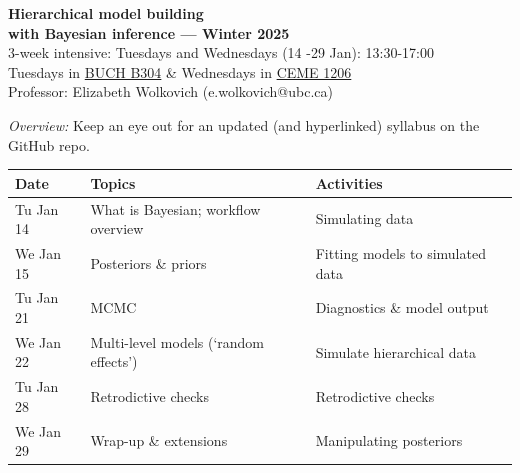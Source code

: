 \documentclass[11pt]{article}
\renewcommand{\baselinestretch}{1.20}
\begin{document}
 
\begin{center} {\large \textbf{Hierarchical model building \\ with Bayesian inference --- Winter 2025}}\\ [10pt] %
3-week intensive: Tuesdays and Wednesdays (14 -29 Jan): 13:30-17:00 \\ %
Tuesdays in \href{https://learningspaces.ubc.ca/classrooms/buch-b304/}{BUCH B304} \& Wednesdays in \href{https://learningspaces.ubc.ca/classrooms/ceme-1206/}{CEME 1206} \\
Professor: Elizabeth Wolkovich (e.wolkovich@ubc.ca) \\
\end{center} 
\emph{Overview:} Keep an eye out for an updated (and hyperlinked) syllabus on the GitHub repo. 
\renewcommand{\baselinestretch}{1.10}
\begin{center}
\begin{tabular}{p{2cm} p{6.5cm}  p{5.5cm}  }
   \textbf{Date}
   & \textbf{Topics}
      & \textbf{Activities} \\ 
\hline \hline
Tu Jan 14  & What is Bayesian; workflow overview  & Simulating data     \\ 
We Jan 15  & Posteriors \& priors &  Fitting models to simulated data       \\ %
Tu Jan 21  & MCMC & Diagnostics \& model output             \\ %
We Jan 22  & Multi-level models (`random effects')  &  Simulate hierarchical data    \\  %
Tu Jan 28  & Retrodictive checks &  Retrodictive checks   \\ %
We Jan 29  & Wrap-up \& extensions  &  Manipulating posteriors       \\ 

\hline
\end{tabular}
\end{center}
\vspace{4pt}
\end{document}
